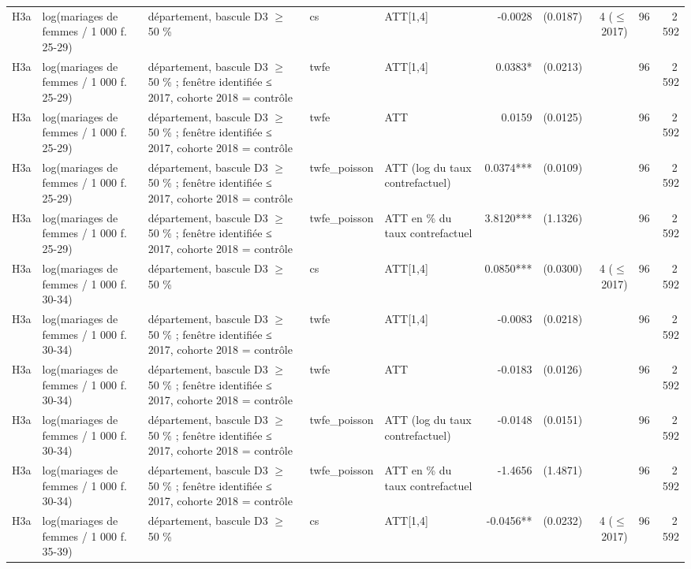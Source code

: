 \begin{table}
\begin{threeparttable}
\begin{tabular}{lp{3.8cm}p{5.5cm}lp{3.5cm}rrrrr}
H3a & log(mariages de femmes / 1 000 f. 25-29) & département, bascule D3 $\geq$ 50 \% & cs & ATT[1,4] & -0.0028 & (0.0187) & 4 ($\leq$ 2017) & 96 & 2\,592 \\
H3a & log(mariages de femmes / 1 000 f. 25-29) & département, bascule D3 $\geq$ 50 \% ; fenêtre identifiée ≤ 2017, cohorte 2018 = contrôle & twfe & ATT[1,4] & 0.0383* & (0.0213) &  & 96 & 2\,592 \\
H3a & log(mariages de femmes / 1 000 f. 25-29) & département, bascule D3 $\geq$ 50 \% ; fenêtre identifiée ≤ 2017, cohorte 2018 = contrôle & twfe & ATT & 0.0159 & (0.0125) &  & 96 & 2\,592 \\
H3a & log(mariages de femmes / 1 000 f. 25-29) & département, bascule D3 $\geq$ 50 \% ; fenêtre identifiée ≤ 2017, cohorte 2018 = contrôle & twfe\_poisson & ATT (log du taux contrefactuel) & 0.0374*** & (0.0109) &  & 96 & 2\,592 \\
H3a & log(mariages de femmes / 1 000 f. 25-29) & département, bascule D3 $\geq$ 50 \% ; fenêtre identifiée ≤ 2017, cohorte 2018 = contrôle & twfe\_poisson & ATT en \% du taux contrefactuel & 3.8120*** & (1.1326) &  & 96 & 2\,592 \\
H3a & log(mariages de femmes / 1 000 f. 30-34) & département, bascule D3 $\geq$ 50 \% & cs & ATT[1,4] & 0.0850*** & (0.0300) & 4 ($\leq$ 2017) & 96 & 2\,592 \\
H3a & log(mariages de femmes / 1 000 f. 30-34) & département, bascule D3 $\geq$ 50 \% ; fenêtre identifiée ≤ 2017, cohorte 2018 = contrôle & twfe & ATT[1,4] & -0.0083 & (0.0218) &  & 96 & 2\,592 \\
H3a & log(mariages de femmes / 1 000 f. 30-34) & département, bascule D3 $\geq$ 50 \% ; fenêtre identifiée ≤ 2017, cohorte 2018 = contrôle & twfe & ATT & -0.0183 & (0.0126) &  & 96 & 2\,592 \\
H3a & log(mariages de femmes / 1 000 f. 30-34) & département, bascule D3 $\geq$ 50 \% ; fenêtre identifiée ≤ 2017, cohorte 2018 = contrôle & twfe\_poisson & ATT (log du taux contrefactuel) & -0.0148 & (0.0151) &  & 96 & 2\,592 \\
H3a & log(mariages de femmes / 1 000 f. 30-34) & département, bascule D3 $\geq$ 50 \% ; fenêtre identifiée ≤ 2017, cohorte 2018 = contrôle & twfe\_poisson & ATT en \% du taux contrefactuel & -1.4656 & (1.4871) &  & 96 & 2\,592 \\
H3a & log(mariages de femmes / 1 000 f. 35-39) & département, bascule D3 $\geq$ 50 \% & cs & ATT[1,4] & -0.0456** & (0.0232) & 4 ($\leq$ 2017) & 96 & 2\,592 \\

\end{tabular}
\end{threeparttable}
\end{table}
